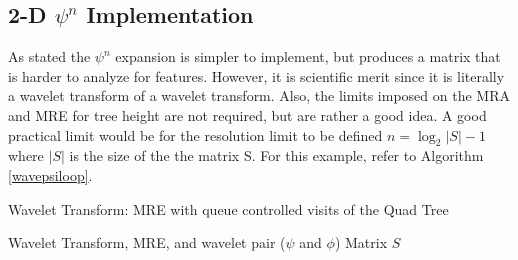 


\subsection {2-D $\psi^n$ Implementation}
As stated the $\psi^n$ expansion is simpler to implement, but produces a matrix that is harder to analyze for features.  However, it is scientific merit since it is literally a wavelet transform of a wavelet transform.   Also, the limits imposed on the MRA and MRE for tree height are not required, but are rather a good idea.  A good practical limit would be for the resolution limit to be defined $n =\log_2 |S| -1$  where $|S|$ is the size of the the matrix S.  For this example, refer to Algorithm \ref{wavepsiloop}.
\begin{algorithm}
\caption {Wavelet Transform: MRE with queue controlled visits of the Quad Tree}
\label{wavepsiloop}
\begin {algorithmic}
\REQUIRE Wavelet Transform, MRE, and wavelet pair ($\psi$ and $\phi$)
\REQUIRE Matrix $S$ 
\ENDFOR 
{}

\end {algorithmic}
\end{algorithm}


